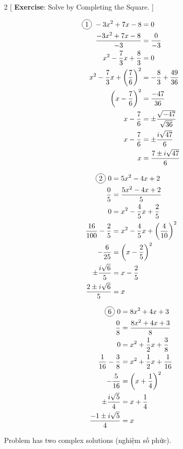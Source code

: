 \begin{multicols}{2}
[
  \textbf{Exercise}: Solve by Completing the Square.
]

\begin{align*}
  \circled{1}\ -3x^{2}+7x-8&=0\\
  \frac{-3x^{2}+7x-8}{-3}&=\frac{0}{-3}\\
  x^{2}-\frac{7}{3}x+\frac{8}{3}&=0\\
  x^{2}-\frac{7}{3}x+\left(\frac{7}{6}\right)^{2}&=-\frac{8}{3}+\frac{49}{36}\\
  \left( x-\frac{7}{6} \right)^{2}&=\frac{-47}{36}\\
  x-\frac{7}{6}&=\pm \frac{\sqrt{-47}}{\sqrt{36}}\\
  x-\frac{7}{6}&=\pm \frac{i\sqrt{47}}{6}\\
  x&=\frac{7\pm i\sqrt{47}}{6}\\
\end{align*}

\begin{align*}
  \circled{2}\ 0&=5x^{2}-4x+2\\
  \frac{0}{5}&=\frac{5x^{2}-4x+2}{5}\\
  0&=x^{2}-\frac{4}{5}x+\frac{2}{5}\\
  \frac{16}{100}-\frac{2}{5}&=x^{2}-\frac{4}{5}x+\left(\frac{4}{10}\right)^{2}\\
  -\frac{6}{25}&=\left(x-\frac{2}{5}\right)^{2}\\
  \pm \frac{i\sqrt{6}}{5}&=x-\frac{2}{5}\\
  \frac{2\pm i\sqrt{6}}{5}&=x
\end{align*}

\begin{align*}
  \circled{6}\ 0&=8x^{2}+4x+3\\
  \frac{0}{8}&=\frac{8x^{2}+4x+3}{8}\\
  0&=x^{2}+\frac{1}{2}x+\frac{3}{8}\\
  \frac{1}{16}-\frac{3}{8}&=x^{2}+\frac{1}{2}x+\frac{1}{16}\\
  -\frac{5}{16}&=\left(x+\frac{1}{4}\right)^{2}\\
  \pm \frac{i\sqrt{5}}{4}&=x+\frac{1}{4}\\
  \frac{-1\pm i\sqrt{5}}{4}&=x
\end{align*}
\end{multicols}

Problem  has two complex solutions (nghiệm số phức).

\newpage

